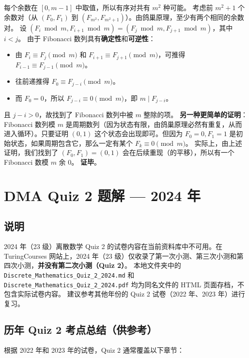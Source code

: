 \documentclass[10pt,a4paper,openany]{ctexbook}
\theoremstyle{definition}
\theoremstyle{remark}
\begin{document}
每个余数在 $[0, m-1]$ 中取值，所以有序对共有 $m^2$ 种可能。
考虑前 $m^2 + 1$ 个余数对（从 $(F_0, F_1)$ 到 $(F_{m^2}, F_{m^2+1})$）。由鸽巢原理，至少有两个相同的余数对。
设 $(F_i \bmod m, F_{i+1} \bmod m) = (F_j \bmod m, F_{j+1} \bmod m)$，其中 $i < j$。
由于 Fibonacci 数列具有\textbf{确定性}和\textbf{可逆性}：
\begin{itemize}
\item 由 $F_i \equiv F_j \pmod{m}$ 和 $F_{i+1} \equiv F_{j+1} \pmod{m}$，可推得 $F_{i-1} \equiv F_{j-1} \pmod{m}$。
\item 往前递推得 $F_0 \equiv F_{j-i} \pmod{m}$。
\item 而 $F_0 = 0$，所以 $F_{j-i} \equiv 0 \pmod{m}$，即 $m \mid F_{j-i}$。

\end{itemize}

且 $j-i > 0$，故找到了 Fibonacci 数列中被 $m$ 整除的项。
\textbf{另一种更简单的证明}：
Fibonacci 数列模 $m$ 是周期数列（因为状态有限，由鸽巢原理必然有重复，从而进入循环）。只要证明 $(0,1)$ 这个状态会出现即可。但因为 $F_0=0, F_1=1$ 是初始状态，如果周期包含它，那么一定有某个 $F_k \equiv 0 \pmod{m}$。
实际上，由上述证明，我们找到了 $(F_0, F_1) = (0, 1)$ 会在后续重现（的平移），所以有一个 Fibonacci 数模 $m$ 余 0。
\textbf{证毕}。


\section{DMA Quiz 2 题解 — 2024 年}

\subsection{说明}

2024 年（23 级）离散数学 Quiz 2 的试卷内容在当前资料库中不可用。在 TuringCourses 网站上，2024 年（23 级）仅收录了第一次小测、第三次小测和第四次小测，\textbf{并没有第二次小测（Quiz 2）}。
本地文件夹中的 \texttt{Discrete\_Mathematics\_Quiz\_2\_2024.md} 和 \texttt{Discrete\_Mathematics\_Quiz\_2\_2024.pdf} 均为同名文件的 HTML 页面存档，不包含实际试卷内容。
建议参考其他年份的 Quiz 2 试卷（2022 年、2023 年）进行复习。
\vspace{-2pt}

\subsection{历年 Quiz 2 考点总结（供参考）}

根据 2022 年和 2023 年的试卷，Quiz 2 通常覆盖以下章节：
\end{document}
